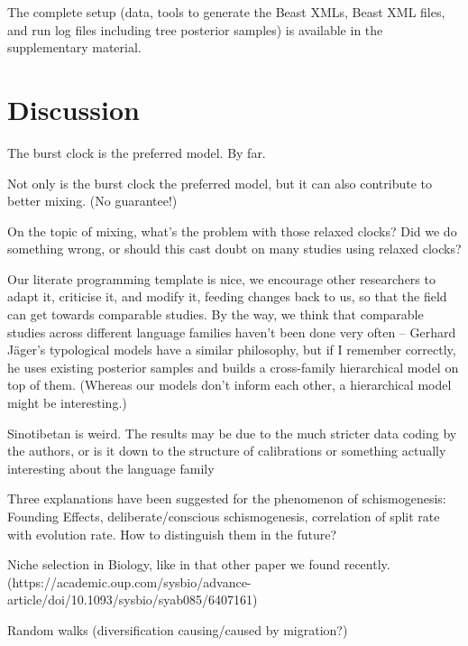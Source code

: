 \documentclass[a4paper,12pt]{scrartcl}
\begin{document}
The complete setup (data, tools to generate the Beast XMLs, Beast XML files, and
run log files including tree posterior samples) is available in the
supplementary material.

\section{Discussion}
The burst clock is the preferred model. By far.

Not only is the burst clock the preferred model, but it can also contribute to
better mixing. (No guarantee!)

On the topic of mixing, what's the problem with those relaxed clocks? Did we do
something wrong, or should this cast doubt on many studies using relaxed clocks?

Our literate programming template is nice, we encourage other researchers to
adapt it, criticise it, and modify it, feeding changes back to us, so that the
field can get towards comparable studies. By the way, we think that comparable
studies across different language families haven't been done very often –
Gerhard Jäger's typological models have a similar philosophy, but if I remember
correctly, he uses existing posterior samples and builds a cross-family
hierarchical model on top of them. (Whereas our models don't inform each other,
a hierarchical model might be interesting.)

Sinotibetan is weird. The results may be due to the much stricter data coding by
the authors, or is it down to the structure of calibrations or something
actually interesting about the language family

Three explanations have been suggested for the phenomenon of schismogenesis:
Founding Effects, deliberate/conscious schismogenesis,
correlation of split rate with evolution rate. How
to distinguish them in the future?

Niche selection in Biology, like in that other paper we found recently.
(https://academic.oup.com/sysbio/advance-article/doi/10.1093/sysbio/syab085/6407161)

Random walks (diversification causing/caused by migration?) \parencite{neureitercan}

\printbibliography{}
\end{document}
